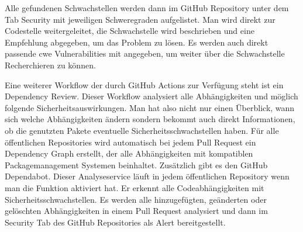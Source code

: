 Alle gefundenen Schwachstellen werden dann im GitHub Repository unter dem Tab Security mit jeweiligen Schweregraden aufgelistet. Man wird direkt zur Codestelle weitergeleitet, die Schwachstelle wird beschrieben und eine Empfehlung abgegeben, um das Problem zu lösen. Es werden auch direkt passende \ac{cwe} Vulnerabilities mit angegeben, um weiter über die Schwachstelle Recherchieren zu können. \cite{code-scanning}

Eine weiterer Workflow der durch GitHub Actions zur Verfügung steht ist ein Dependency Review. Dieser Workflow analysiert alle Abhängigkeiten und möglich folgende Sicherheitsauswirkungen. Man hat also nicht nur einen Überblick, wann sich welche Abhängigkeiten ändern sondern bekommt auch direkt Informationen, ob die genutzten Pakete eventuelle Sicherheitsschwachstellen haben.
Für alle öffentlichen Repositories wird automatisch bei jedem Pull Request ein Dependency Graph erstellt, der alle Abhängigkeiten mit kompatiblen Packagemanagement Systemen beinhaltet.
Zusätzlich gibt es den GitHub Dependabot. Dieser Analyseservice läuft in jedem öffentlichen Repository wenn man die Funktion aktiviert hat. Er erkennt alle Codeabhängigkeiten mit Sicherheitsschwachstellen. Es werden alle hinzugefügten, geänderten oder gelöschten Abhängigkeiten in einem Pull Request analysiert und dann im Security Tab des GitHub Repositories als Alert bereitgestellt.

